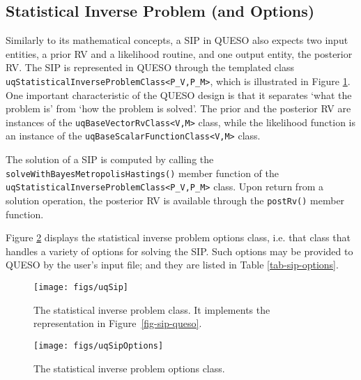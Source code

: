 \subsection{Statistical Inverse Problem (and Options)}
Similarly to its mathematical concepts, a SIP in QUESO also expects two input entities, a prior RV and a likelihood routine, and one output entity, the posterior RV.
The SIP is represented in QUESO through the templated class \verb+uqStatisticalInverseProblemClass<P_V,P_M>+, which is illustrated in Figure \ref{fig-sip-class}.
One important characteristic of the QUESO design is that it  separates `what the problem is' from `how the problem is solved'.
The prior and the posterior RV are instances of the \verb+uqBaseVectorRvClass<V,M>+ class, while
the likelihood function is an instance of the \verb+uqBaseScalarFunctionClass<V,M>+ class.

The solution of a SIP is computed by calling the \verb+solveWithBayesMetropolisHastings()+ member function of the \verb+uqStatisticalInverseProblemClass<P_V,P_M>+ class.
Upon return from a solution operation, the posterior RV is available through the \verb+postRv()+ member function.


Figure \ref{fig-sip-options-class} displays the  statistical inverse problem options class, i.e. that class that handles a variety of options for solving the SIP. Such options may be provided to QUESO by the user's input file; and they are listed in Table \ref{tab-sip-options}.


\begin{figure}[htpb]
\centering
\texttt{[image: figs/uqSip]}
\vspace{-8pt}
\caption{The statistical inverse problem class. It implements the representation in Figure~\ref{fig-sip-queso}.}
\label{fig-sip-class}
\end{figure}

\begin{figure}[htpb]
\centering
\texttt{[image: figs/uqSipOptions]}
\vspace{-8pt}
\caption{The statistical inverse problem options class.}
\label{fig-sip-options-class}
\end{figure}


